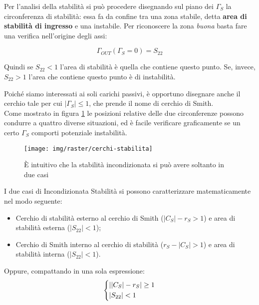 Per l'analisi della stabilità si può procedere disegnando sul piano dei $\Gamma_S$	la circonferenza di stabilità: essa fa da confine tra una zona stabile, detta \textbf{area di stabilità di ingresso} e una instabile. Per riconoscere la zona \textit{buona} basta fare una verifica nell'origine degli assi:

\[\Gamma_{OUT}(\Gamma_S = 0) = S_{22}\]

Quindi se $S_{22} < 1$ l'area di stabilità è quella che contiene questo punto. Se, invece, $S_{22} > 1$ l'area che contiene questo punto è di instabilità.

Poiché siamo interessati ai soli carichi passivi, è opportuno disegnare anche il cerchio tale per cui $|\Gamma_S| \leq 1$, che prende il nome di cerchio di Smith.\\
Come mostrato in figura \ref{fig:cerchi-stabilita} le posizioni relative delle due circonferenze possono condurre a quattro diverse situazioni, ed è facile verificare graficamente se un certo $\Gamma_S$ comporti potenziale instabilità. 
%	
%	

\begin{figure}[hbt]
	\centering
	\texttt{[image: img/raster/cerchi-stabilita]}
	\caption{È intuitivo che la stabilità incondizionata si può avere soltanto in due casi}
	\label{fig:cerchi-stabilita}
\end{figure}

I due casi di Incondizionata Stabilità si possono caratterizzare matematicamente nel modo seguente:

\begin{itemize}
	\item Cerchio di stabilità esterno al cerchio di Smith ($|C_S| - r_S > 1$) e area di stabilità esterna ($|S_{22}|<1$);
	\item
	Cerchio di Smith interno al cerchio di stabilità ($r_S - |C_S| > 1$) e area di stabilità interna ($|S_{22}|<1$).
\end{itemize}

Oppure, compattando in una sola espressione:
\begin{equation}
\begin{dcases}
\left|\left|C_S\right| - r_S\right| \geq 1\\
|S_{22}| <1
\end{dcases}
\end{equation}

